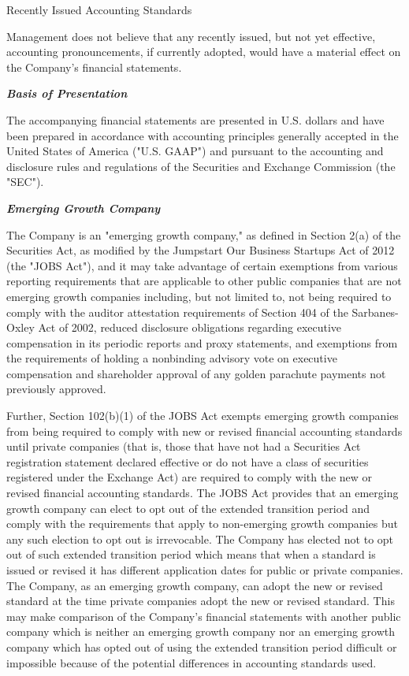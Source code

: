 \documentclass[11pt,a4paper]{article}
\begin{document}
Recently Issued Accounting Standards

Management does not believe that any recently issued, but not yet effective, accounting pronouncements, if currently adopted, would have a material effect on the Company's financial statements.

\textit{\textbf{Basis of Presentation}}

The accompanying financial statements are presented in U.S. dollars and have been prepared in accordance with accounting principles generally accepted in the United States of America ("U.S. GAAP") and pursuant to the accounting and disclosure rules and regulations of the Securities and Exchange Commission (the "SEC").

\textit{\textbf{Emerging Growth Company}}

The Company is an "emerging growth company," as defined in Section 2(a) of the Securities Act, as modified by the Jumpstart Our Business Startups Act of 2012 (the "JOBS Act"), and it may take advantage of certain exemptions from various reporting requirements that are applicable to other public companies that are not emerging growth companies including, but not limited to, not being required to comply with the auditor attestation requirements of Section 404 of the Sarbanes-Oxley Act of 2002, reduced disclosure obligations regarding executive compensation in its periodic reports and proxy statements, and exemptions from the requirements of holding a nonbinding advisory vote on executive compensation and shareholder approval of any golden parachute payments not previously approved.

Further, Section 102(b)(1) of the JOBS Act exempts emerging growth companies from being required to comply with new or revised financial accounting standards until private companies (that is, those that have not had a Securities Act registration statement declared effective or do not have a class of securities registered under the Exchange Act) are required to comply with the new or revised financial accounting standards. The JOBS Act provides that an emerging growth company can elect to opt out of the extended transition period and comply with the requirements that apply to non-emerging growth companies but any such election to opt out is irrevocable. The Company has elected not to opt out of such extended transition period which means that when a standard is issued or revised it has different application dates for public or private companies. The Company, as an emerging growth company, can adopt the new or revised standard at the time private companies adopt the new or revised standard. This may make comparison of the Company's financial statements with another public company which is neither an emerging growth company nor an emerging growth company which has opted out of using the extended transition period difficult or impossible because of the potential differences in accounting standards used.
\end{document}
